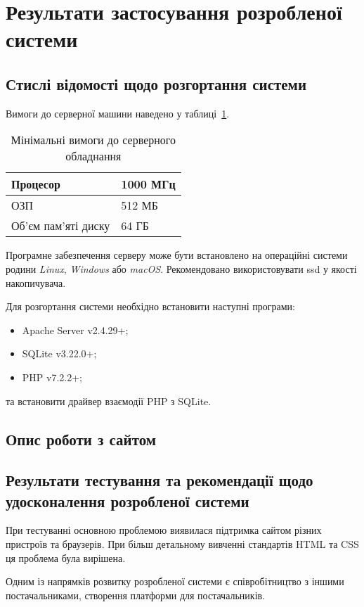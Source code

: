\section{Результати застосування розробленої системи}
\subsection{Стислі відомості щодо розгортання системи}

Вимоги до серверної машини наведено у таблиці~\ref{tab:sw_requirements}. 

\begin{table}[h]
	\caption{Мінімальні вимоги до серверного обладнання}
	\label{tab:sw_requirements}
	\begin{tabular}{l|l}
		Процесор & 1000 МГц \\ \hline
		ОЗП & 512 МБ \\ \hline
		Об'єм пам'яті диску & 64 ГБ 
	\end{tabular}
\end{table}

Програмне забезпечення серверу може бути встановлено на операційні системи родини \textit{Linux}, \textit{Windows} або \textit{macOS}.
Рекомендовано використовувати \acrshort{ssd} у якості накопичувача.

Для розгортання системи необхідно встановити наступні програми:
\begin{itemize}
	\item Apache Server v2.4.29+;
	\item SQLite v3.22.0+;
	\item PHP v7.2.2+;
\end{itemize}
та встановити драйвер взаємодії PHP з SQLite.

\subsection{Опис роботи з сайтом}

\subsection{Результати тестування та рекомендації щодо удосконалення розробленої системи}
При тестуванні основною проблемою виявилася підтримка сайтом різних пристроїв та браузерів. 
При більш детальному вивченні стандартів HTML та CSS ця проблема була вирішена.

Одним із напрямків розвитку розробленої системи є співробітництво з іншими постачальниками, створення платформи для постачальників. 
